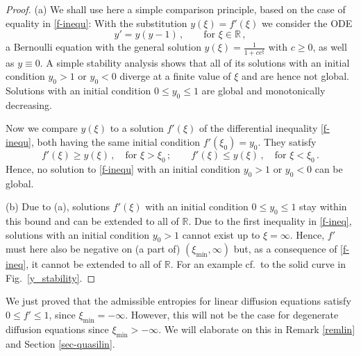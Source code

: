 \documentclass[reqno]{amsart}
\newcommand{\R}{\mathbb{R}}
\newcommand{\be}{\begin{equation}}
\newcommand{\ee}{\end{equation}}
\begin{document}
\begin{proof}
(a) We shall use here a simple comparison principle, based on the case of equality in \eqref{f-inequ}: With the substitution $y(\xi)=f'(\xi)$ we consider the ODE
\be\label{y-ODE}
  y'=y(y-1)\,,\qquad\mbox{for } \xi\in\R\,,
\ee
a Bernoulli equation with the general solution $y(\xi)=\frac{1}{1+ce^\xi}$ with $c\ge 0$, as well as $y\equiv0$.
A simple stability analysis shows that all of its solutions with an initial condition $y_0>1$ or $y_0<0$ diverge at a finite value of $\xi$ and are hence not global. Solutions with an initial condition $0\le y_0\le 1$ are global and monotonically decreasing.

Now we compare $y(\xi)$ to a solution $f'(\xi)$ of the differential inequality \eqref{f-inequ}, both having the same initial condition $f'(\xi_0)=y_0$. They satisfy
\begin{equation}\label{f-ineq}
  f'(\xi)\ge y(\xi)\,,\quad\mbox{for } \xi>\xi_0\,;\qquad 
  f'(\xi)\le y(\xi)\,,\quad\mbox{for } \xi<\xi_0\,. 
\end{equation}
Hence, no solution to \eqref{f-inequ} with an initial condition $y_0>1$ or $y_0<0$ can be global. 

\noindent
(b) Due to (a), solutions $f'(\xi)$ with an initial condition $0\le y_0\le1$ stay within this bound and can be extended to all of $\R$. Due to the first inequality in \eqref{f-ineq}, solutions with an initial condition $y_0>1$ cannot exist up to $\xi=\infty$. Hence, $f'$ must 
here also be negative on (a part of) $(\xi_{\min},\infty)$ but, as a consequence of \eqref{f-ineq}, it cannot be extended to all of $\R$. For an example cf.\ to the solid curve in Fig.\ \ref{y_stability}.
\end{proof}

We just proved that the admissible entropies for linear diffusion equations satisfy $0\leq f'\leq 1$, since $\xi_{\min}=-\infty$. However, this will not be the case for degenerate diffusion equations since $\xi_{\min}>-\infty$. We will elaborate on this in Remark \ref{remlin} and Section \ref{sec-quasilin}.
\end{document}
